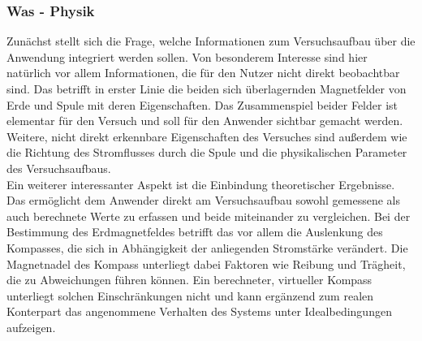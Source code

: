 \subsubsection{Was - Physik}
Zunächst stellt sich die Frage, welche Informationen zum Versuchsaufbau über die Anwendung integriert werden sollen. Von besonderem Interesse sind hier natürlich vor allem Informationen, die für den Nutzer nicht direkt beobachtbar sind. Das betrifft in erster Linie die beiden sich überlagernden Magnetfelder von Erde und Spule mit deren Eigenschaften. Das Zusammenspiel beider Felder ist elementar für den Versuch und soll für den Anwender sichtbar gemacht werden. Weitere, nicht direkt erkennbare Eigenschaften  des Versuches sind außerdem wie die Richtung des Stromflusses durch die Spule und die physikalischen Parameter des Versuchsaufbaus.\\

Ein weiterer interessanter Aspekt ist die Einbindung theoretischer Ergebnisse. Das ermöglicht dem Anwender direkt am Versuchsaufbau sowohl gemessene als auch berechnete Werte zu erfassen und beide miteinander zu vergleichen. Bei der Bestimmung des Erdmagnetfeldes betrifft das vor allem die Auslenkung des Kompasses, die sich in Abhängigkeit der anliegenden Stromstärke verändert. Die Magnetnadel des Kompass unterliegt dabei Faktoren wie Reibung und Trägheit, die zu Abweichungen führen können. Ein berechneter, virtueller Kompass unterliegt solchen Einschränkungen nicht und kann ergänzend zum realen Konterpart das angenommene Verhalten des Systems unter Idealbedingungen aufzeigen.\\

